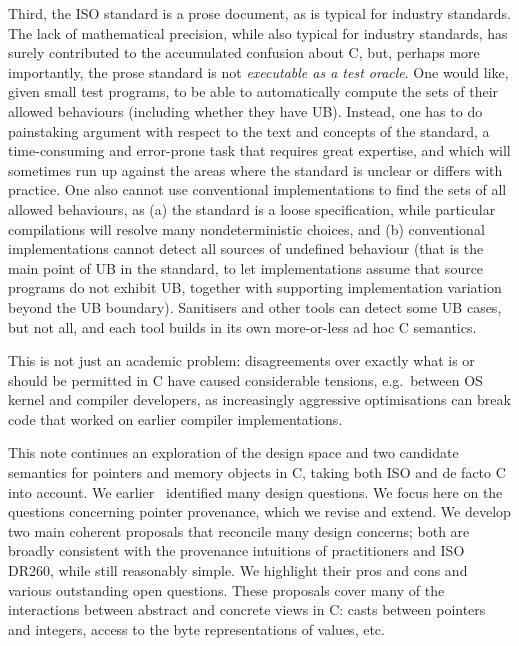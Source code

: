 \documentclass[acmsmall,review,screen]{acmart}\settopmatter{printfolios=true,printccs=false,printacmref=false}
\begin{document}
Third, the ISO standard is a prose document, as is typical for
industry standards. The lack of mathematical precision, while also
typical for
industry standards, has surely
contributed to the accumulated confusion about C, but, perhaps more
importantly, the prose standard is not \emph{executable as a
  test oracle}.  One would like, given small test programs, to be able
to automatically compute the sets of their allowed behaviours
(including whether they have UB).  Instead, one has
to do painstaking argument with respect to the text and concepts of
the standard, a time-consuming and error-prone task that requires
great expertise, and which will sometimes run up against the areas
where the standard is unclear or differs with practice. 
%
One also cannot use conventional implementations to find the sets of
all allowed
behaviours, as (a) the standard is a loose specification, while
particular compilations will resolve many nondeterministic choices,
and (b) conventional implementations cannot detect all sources of
undefined behaviour
 (that is the main point of UB in the
standard, to let implementations assume that source programs do not
exhibit UB, together with supporting implementation variation
beyond the UB boundary).   Sanitisers and other tools can detect some UB cases,
but not all, and each tool builds in its own more-or-less ad hoc C semantics.
% 



This is not just an academic problem: disagreements over exactly what
is or should be permitted in C have caused considerable tensions,
e.g.~between OS kernel and compiler developers, as
increasingly aggressive optimisations can break code that worked on
earlier compiler implementations.



This note continues 
an exploration of the design space and two candidate semantics for pointers and memory
objects in C, taking
both ISO and de facto C into account. 
%
We earlier~\cite{Cerberus-PLDI16,N2013} identified many
design questions. 
%
We focus here on the questions concerning pointer provenance, which we revise and
extend.  We develop two main coherent proposals that reconcile many design
concerns; both are broadly consistent with the provenance intuitions of
practitioners and ISO DR260, while still reasonably simple. We
highlight their pros and cons and various outstanding open questions.
These proposals cover many of the interactions between abstract and concrete
views in C: casts between pointers and integers, access to the byte
representations of values, etc.
%
\end{document}
